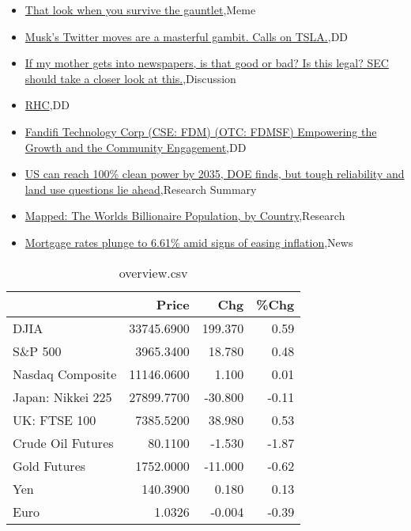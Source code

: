 \documentclass{article}%
\begin{document}
%
\begin{itemize}%
\item%
\href{https://reddit.com/r/wallstreetbets/comments/yzarn5/that\_look\_when\_you\_survive\_the\_gauntlet/}{That look when you survive the gauntlet},Meme%
\item%
\href{https://reddit.com/r/wallstreetbets/comments/yzahl3/musks\_twitter\_moves\_are\_a\_masterful\_gambit\_calls/}{Musk's Twitter moves are a masterful gambit. Calls on TSLA.},DD%
\item%
\href{https://reddit.com/r/wallstreetbets/comments/yz9ms9/if\_my\_mother\_gets\_into\_newspapers\_is\_that\_good\_or/}{If my mother gets into newspapers, is that good or bad? Is this legal? SEC should take a closer look at this.},Discussion%
\item%
\href{https://reddit.com/r/Baystreetbets/comments/yyy2z7/rhc/}{RHC},DD%
\item%
\href{https://reddit.com/r/Baystreetbets/comments/yyszop/fandifi\_technology\_corp\_cse\_fdm\_otc\_fdmsf/}{Fandifi Technology Corp (CSE: FDM) (OTC: FDMSF) Empowering the Growth and the Community Engagement},DD%
\item%
\href{https://reddit.com/r/Economics/comments/yz2m92/us\_can\_reach\_100\_clean\_power\_by\_2035\_doe\_finds/}{US can reach 100\% clean power by 2035, DOE finds, but tough reliability and land use questions lie ahead},Research Summary%
\item%
\href{https://reddit.com/r/Economics/comments/yyw3it/mapped\_the\_worlds\_billionaire\_population\_by/}{Mapped: The Worlds Billionaire Population, by Country},Research%
\item%
\href{https://reddit.com/r/Economics/comments/yypj1l/mortgage\_rates\_plunge\_to\_661\_amid\_signs\_of\_easing/}{Mortgage rates plunge to 6.61\% amid signs of easing inflation},News%
\end{itemize}%


\begin{table}[htbp]%
\caption{overview.csv}%
\centering%
\begin{adjustbox}{width=1\textwidth}%
\begin{tabular}{lrrr}
\toprule
                  &      Price &     Chg &  \%Chg \\
\midrule
             DJIA & 33745.6900 & 199.370 &  0.59 \\
          S\&P 500 &  3965.3400 &  18.780 &  0.48 \\
 Nasdaq Composite & 11146.0600 &   1.100 &  0.01 \\
Japan: Nikkei 225 & 27899.7700 & -30.800 & -0.11 \\
     UK: FTSE 100 &  7385.5200 &  38.980 &  0.53 \\
Crude Oil Futures &    80.1100 &  -1.530 & -1.87 \\
     Gold Futures &  1752.0000 & -11.000 & -0.62 \\
              Yen &   140.3900 &   0.180 &  0.13 \\
             Euro &     1.0326 &  -0.004 & -0.39 \\
\bottomrule
\end{tabular}
%
\end{adjustbox}%
\end{table}
\end{document}
